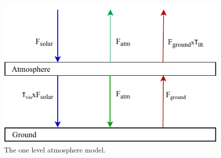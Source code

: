 \begin{figure}[htb!]
    \centering
    \includegraphics[width=0.7\linewidth]{images/two-level-model.pdf}
   \caption{The one level atmosphere model.}
    \label{fig:1d-atm}
\end{figure}
